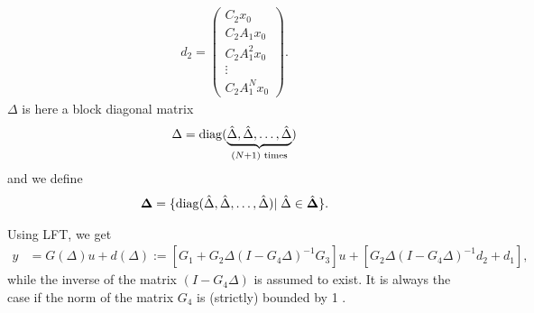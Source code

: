 \begin{align}
d_2 = \begin{pmatrix}
C_2 x_0 \\ C_2A_1 x_0 \\ C_2A_1^2 x_0 \\ \vdots \\ C_2A_1^Nx_0
\end{pmatrix}.
\end{align}
$\Delta$ is here a block diagonal matrix 
\begin{align}
\Delta = \operatorname*{diag}(\underbrace{\hat{\Delta}, \hat{\Delta}, \dots, \hat{\Delta}}_{(N+1) \text{ times}})
\end{align}
and we define 
\begin{align}
\mathbf{\Delta} = \{\operatorname*{diag}(\hat{\Delta}, \hat{\Delta}, \dots, \hat{\Delta})| \; \hat{\Delta}\in \hat{\mathbf{\Delta}}\}.
\end{align}




Using LFT, we get 
\begin{align}
\label{eq:rob:y = G(Delta) + d(Delta)}
y&= G(\Delta)u + d(\Delta) := \left[G_1 + G_2 \Delta (I - G_4\Delta)^{-1}G_3\right] u + \left[G_2 \Delta (I - G_4\Delta)^{-1} d_2 + d_1\right], 
\end{align}
while the inverse of the matrix $(I - G_4\Delta)$ is assumed to exist. It is always the case if the norm of the matrix $G_4$ is (strictly) bounded by 1 \cite{SchRC}.




